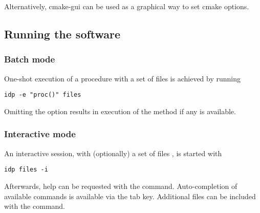 Alternatively, cmake-gui can be used as a graphical way to set cmake options.

\subsection{Running the software}
\subsubsection{Batch mode}
One-shot execution of a procedure  with a set of files  is achieved by running
\begin{lstlisting}
idp -e "proc()" files
\end{lstlisting}
Omitting the  option results in execution of the  method if any is available.

\subsubsection{Interactive mode}
An interactive session, with (optionally) a set of files , is started with 
\begin{lstlisting}
idp files -i
\end{lstlisting}

Afterwards, help can be requested with the  command. 
Auto-completion of available commands is available via the tab key.
Additional files can be included with the  command.
